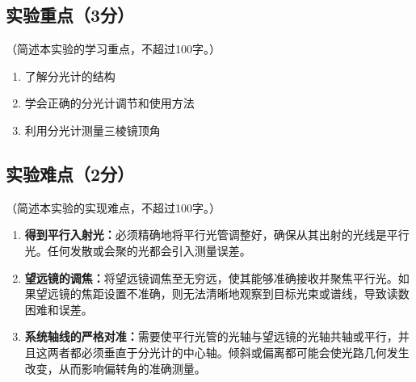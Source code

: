 \documentclass[yuxi]{../template/Report}%
\begin{document}
\subsection{实验重点（3分）}
（简述本实验的学习重点，不超过100字。）
\begin{enumerate}[left = 2em]
    \item 了解分光计的结构
    \item 学会正确的分光计调节和使用方法
    \item 利用分光计测量三棱镜顶角
\end{enumerate}
\subsection{实验难点（2分）}
（简述本实验的实现难点，不超过100字。）
\begin{enumerate}[left = 2em]
    \item \textbf{得到平行入射光：}必须精确地将平行光管调整好，确保从其出射的光线是平行光。任何发散或会聚的光都会引入测量误差。

    \item \textbf{望远镜的调焦：}将望远镜调焦至无穷远，使其能够准确接收并聚焦平行光。如果望远镜的焦距设置不准确，则无法清晰地观察到目标光束或谱线，导致读数困难和误差。

    \item \textbf{系统轴线的严格对准：}需要使平行光管的光轴与望远镜的光轴共轴或平行，并且这两者都必须垂直于分光计的中心轴。倾斜或偏离都可能会使光路几何发生改变，从而影响偏转角的准确测量。
\end{enumerate}
\end{document}
